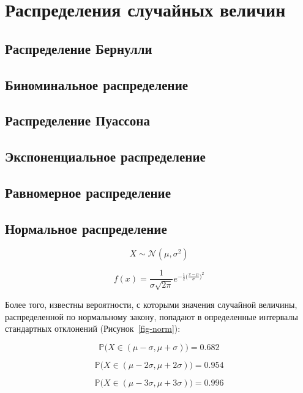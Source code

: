 \documentclass[
  letterpaper,
]{scrbook}
\newcommand{\prob}{\mathbb{P}}
\newcommand{\norm}{\mathcal{N}}
\theoremstyle{definition}
\theoremstyle{remark}
\begin{document}
\section{Распределения случайных
величин}\label{stats-rand-values-distributions}

\subsection{Распределение Бернулли}\label{stats-rand-values-bernoulli}

\subsection{Биноминальное распределение}\label{stats-rand-values-binom}

\subsection{Распределение Пуассона}\label{stats-rand-values-pois}

\subsection{Экспоненциальное распределение}\label{stats-rand-values-exp}

\subsection{Равномерное распределение}\label{stats-rand-values-uniform}

\subsection{Нормальное распределение}\label{stats-rand-values-norm}

\[
X \sim \norm(\mu, \sigma^2)
\]

\[
f(x) = \frac{1}{\sigma \sqrt{2\pi}}e^{-\frac{1}{2}\big(\frac{x - \mu}{\sigma}\big)^2}
\]

Более того, известны вероятности, с которыми значения случайной
величины, распределенной по нормальному закону, попадают в определенные
интервалы стандартных отклонений (Рисунок~\ref{fig-norm}):

\[
\prob \big( X \in (\mu\!-\!\sigma, \mu\!+\!\sigma) \big) = 0.682
\]

\[
\prob \big( X \in (\mu\!-\!2\sigma, \mu\!+\!2\sigma) \big) = 0.954
\]

\[
\prob \big( X \in (\mu\!-\!3\sigma, \mu\!+\!3\sigma) \big) = 0.996
\]
\end{document}
